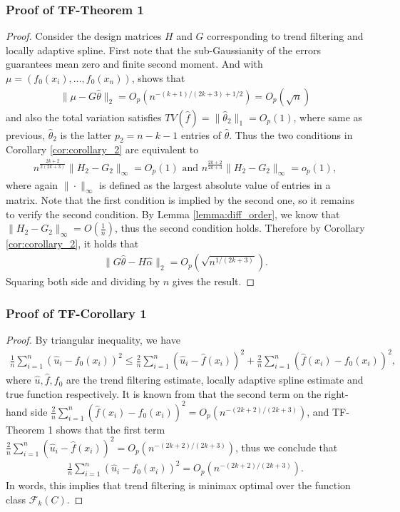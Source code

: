 \documentclass[a4paper]{article}
\renewcommand{\cal}{\mathcal}
\begin{document}
\subsubsection{Proof of TF-Theorem 1}
\begin{proof}
Consider the design matrices $H$ and $G$ corresponding to trend filtering and locally adaptive spline. First note that the sub-Gaussianity of the errors guarantees mean zero and finite second moment. And with $\mu = (f_0(x_i), \ldots, f_0(x_n))$, \cite{mammen1997locally} shows that
\begin{align*}
\|\mu - G\hat{\theta}\|_2 = O_p(n^{-(k+1)/(2k+3) + 1/2}) = O_p(\sqrt{n})
\end{align*}
and also the total variation satisfies $TV(\hat{f}) = \|\hat{\theta}_2\|_1 = O_p(1)$, where same as previous, $\hat{\theta}_2$ is the latter $p_2 = n-k-1$ entries of $\hat{\theta}$. Thus the two conditions in Corollary \ref{cor:corollary_2} are equivalent to
\begin{align*}
n^{\frac{2k+2}{2(2k+3)}}\|H_2-G_2\|_\infty = O_p(1) \text{ and }n^{\frac{2k+2}{2k+3}}\|H_2-G_2\|_\infty = o_p(1),
\end{align*}
where again $\|\cdot\|_\infty$ is defined as the largest absolute value of entries in a matrix. Note that the first condition is implied by the second one, so it remains to verify the second condition. By Lemma \ref{lemma:diff_order}, we know that $\|H_2- G_2\|_\infty = O(\frac{1}{n})$, thus the second condition holds. Therefore by Corollary \ref{cor:corollary_2}, it holds that 
\begin{align*}
\|G\hat{\theta} - H\hat{\alpha}\|_2 = O_p(\sqrt{n^{1/(2k+3)}}).
\end{align*}
Squaring both side and dividing by $n$ gives the result. 
\end{proof}

\subsubsection{Proof of TF-Corollary 1}
\begin{proof}
By triangular inequality, we have 
\begin{align*}
\frac{1}{n}\sum_{i=1}^n(\hat{u}_i - f_0(x_i))^2 \leq \frac{2}{n}\sum_{i=1}^n(\hat{u}_i - \hat{f}(x_i))^2 + \frac{2}{n}\sum_{i=1}^n (\hat{f}(x_i) - f_0(x_i))^2,
\end{align*}
where $\hat{u}, \hat{f}, f_0$ are the trend filtering estimate, locally adaptive spline estimate and true function respectively. It is known from \cite{mammen1997locally} that the second term on the right-hand side $\frac{2}{n}\sum_{i=1}^n (\hat{f}(x_i) - f_0(x_i))^2 = O_p(n^{-(2k+2)/(2k+3)})$, and TF-Theorem 1 shows that the first term $\frac{2}{n}\sum_{i=1}^n(\hat{u}_i - \hat{f}(x_i))^2 = O_p(n^{-(2k+2)/(2k+3)})$, thus we conclude that 
\begin{align*}
\frac{1}{n}\sum_{i=1}^n(\hat{u}_i - f_0(x_i))^2 = O_p(n^{-(2k+2)/(2k+3)}).
\end{align*}
In words, this implies that trend filtering is minimax optimal over the function class $\cal{F}_k(C)$.
\end{proof}
\end{document}
